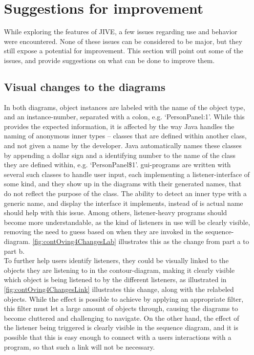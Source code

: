 \section{Suggestions for improvement}\label{jiveSuggestions}

While exploring the features of JIVE, a few issues regarding use and behavior were encountered.
None of these issues can be considered to be major, but they still expose a potential for improvement.
This section will point out some of the issues, and provide suggestions on what can be done to improve them.
~\\

\subsection{Visual changes to the diagrams}\label{jiveSuggestionsVisual}
In both diagrams, object instances are labeled with the name of the object type, and an instance-number, separated with a colon, e.g. `PersonPanel:1'.
While this provides the expected information, it is affected by the way Java handles the naming of anonymous inner types -- classes that are defined within another class, and not given a name by the developer.
Java automatically names these classes by appending a dollar sign and a identifying number to the name of the class they are defined within, e.g. `PersonPanel\$1'.
\gls{gui}-programs are written with several such classes to handle user input, each implementing a listener-interface of some kind, and they show up in the diagrams with their generated names, that do not reflect the purpose of the class.
The ability to detect an inner type with a generic name, and display the interface it implements, instead of is actual name should help with this issue.
Among others, listener-heavy programs should become more understandable, as the kind of listeners in use will be clearly visible, removing the need to guess based on when they are invoked in the sequence-diagram.
\autoref{fig:contOving4ChangesLab} illustrates this as the change from part a to part b.
~\\

To further help users identify listeners, they could be visually linked to the objects they are listening to in the contour-diagram, making it clearly visible which object is being listened to by the different listeners, as illustrated in \autoref{fig:contOving4ChangesLink} illustrates this change, along with the relabeled objects.
While the effect is possible to achieve by applying an appropriate filter, this filter must let a large amount of objects through, causing the diagrams to become cluttered and challenging to navigate.
On the other hand, the effect of the listener being triggered is clearly visible in the sequence diagram, and it is possible that this is easy enough to connect with a users interactions with a program, so that such a link will not be necessary.
~\\

